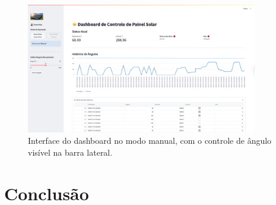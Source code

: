 \documentclass{article}
\begin{document}
\begin{figure}[H]
    \centering
    \includegraphics[width=0.9\textwidth]{tela_modo_manual.png}
    \caption{Interface do dashboard no modo manual, com o controle de ângulo visível na barra lateral.}
    \label{fig:tela_manual}
\end{figure}

\section{Conclusão}
\end{document}
